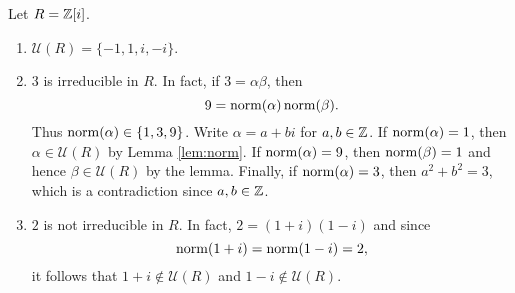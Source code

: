 \begin{example}
	Let $R=\mathbb{Z}[i]$. 
	\begin{enumerate}
		\item $\mathcal{U}(R)=\{-1,1,i,-i\}$.
		\item $3$ is irreducible in $R$. In fact, if $3=\alpha\beta$, then
			\[
            9=\operatorname{norm}(\alpha)\operatorname{norm}(\beta).
            \]
            Thus $\operatorname{norm}(\alpha)\in\{1,3,9\}$. Write
			$\alpha=a+bi$ for $a,b\in\mathbb{Z}$. If $\operatorname{norm}(\alpha)=1$, then $\alpha\in\mathcal{U}(R)$ by Lemma \ref{lem:norm}. 
			If $\operatorname{norm}(\alpha)=9$, then $\operatorname{norm}(\beta)=1$ and hence $\beta\in\mathcal{U}(R)$ by the lemma. Finally, 
			if $\operatorname{norm}(\alpha)=3$, then $a^2+b^2=3$, which is a contradiction since $a,b\in\mathbb{Z}$. 
		\item $2$ is not irreducible in $R$. In fact, $2=(1+i)(1-i)$ and
			since \[
			\operatorname{norm}(1+i)=\operatorname{norm}(1-i)=2,
			\]
			it follows that $1+i\not\in\mathcal{U}(R)$ 
			and $1-i\not\in\mathcal{U}(R)$. 
	\end{enumerate}	
\end{example}

